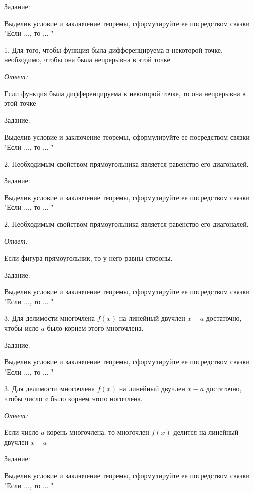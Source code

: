 \documentclass[10pt]{beamer}
\theoremstyle{remark}
\theoremstyle{definition}
\begin{document}
\begin{frame}[allowframebreaks]
\framebreak 

Задание: 

Выделив условие и заключение теоремы, сформулируйте ее посредством связки "Если ..., то ... "

1. Для того, чтобы функция была дифференцируема в некоторой точке, необходимо, чтобы она была непрерывна в этой точке

\textit{Ответ:} 

Если функция была дифференцируема в некоторой точке, то она непрерывна в этой точке

\framebreak 

Задание: 

Выделив условие и заключение теоремы, сформулируйте ее посредством связки "Если ..., то ... "

2. Необходимым свойством прямоугольника является равенство его диагоналей. 


\framebreak 

Задание: 

Выделив условие и заключение теоремы, сформулируйте ее посредством связки "Если ..., то ... "

2. Необходимым свойством прямоугольника является равенство его диагоналей. 

\textit{Ответ:} 

Если фигура прямоугольник, то у него равны стороны.


\framebreak 

Задание: 

Выделив условие и заключение теоремы, сформулируйте ее посредством связки "Если ..., то ... "

3. Для делимости многочлена $f(x)$ на линейный двучлен $x - a$ достаточно, чтобы исло $a$ было корнем этого многочлена.


\framebreak 

Задание: 

Выделив условие и заключение теоремы, сформулируйте ее посредством связки "Если ..., то ... "

3. Для делимости многочлена $f(x)$ на линейный двучлен $x - a$ достаточно, чтобы число $a$ было корнем этого ногочлена.

\textit{Ответ:} 

Если число $a$ корень многочлена, то многочлен $f(x)$ делится на линейный двучлен $x - a$


\framebreak 

Задание: 

Выделив условие и заключение теоремы, сформулируйте ее посредством связки "Если ..., то ... "


\end{frame}
\end{document}
